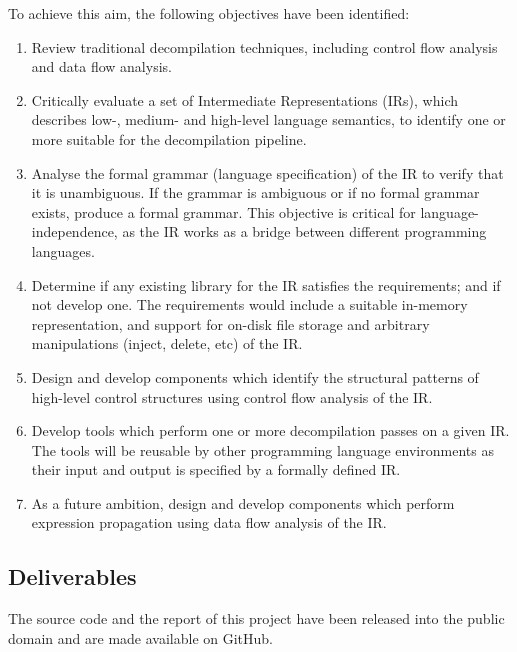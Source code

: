 To achieve this aim, the following objectives have been identified:
\begin{enumerate}
	\item Review traditional decompilation techniques, including control flow analysis and data flow analysis.
	\label{itm:obj_review_decomp_techniques}
	\item Critically evaluate a set of Intermediate Representations (IRs), which describes low-, medium- and high-level language semantics, to identify one or more suitable for the decompilation pipeline.
	\label{itm:obj_review_suitable_ir}
	\item Analyse the formal grammar (language specification) of the IR to verify that it is unambiguous. If the grammar is ambiguous or if no formal grammar exists, produce a formal grammar. This objective is critical for language-independence, as the IR works as a bridge between different programming languages.
	\label{itm:obj_formal_ir}
	\item Determine if any existing library for the IR satisfies the requirements; and if not develop one. The requirements would include a suitable in-memory representation, and support for on-disk file storage and arbitrary manipulations (inject, delete, etc) of the IR.
	\label{itm:obj_ir_library}
	\item Design and develop components which identify the structural patterns of high-level control structures using control flow analysis of the IR.
	\label{itm:obj_control_flow_analysis_component}
	\item Develop tools which perform one or more decompilation passes on a given IR. The tools will be reusable by other programming language environments as their input and output is specified by a formally defined IR.
	\label{itm:obj_decomp_pass_tool}
	\item As a future ambition, design and develop components which perform expression propagation using data flow analysis of the IR.
	\label{itm:obj_data_analysis_library}
\end{enumerate}


\subsection{Deliverables}

The source code and the report of this project have been released into the public domain \footnotemark and are made available on GitHub.

